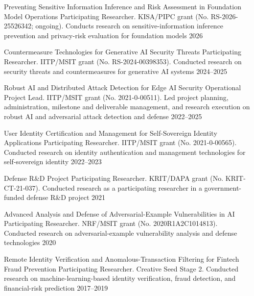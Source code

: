 
\begin{cvhonors}
  \cvhonor
    {Preventing Sensitive Information Inference and Risk Assessment in Foundation Model Operations}
    {Participating Researcher. KISA/PIPC grant (No. RS-2026-25526342; ongoing). Conducts research on sensitive-information inference prevention and privacy-risk evaluation for foundation models}
    {}
    {2026}

  \cvhonor
    {Countermeasure Technologies for Generative AI Security Threats}
    {Participating Researcher. IITP/MSIT grant (No. RS-2024-00398353). Conducted research on security threats and countermeasures for generative AI systems}
    {}
    {2024--2025}

  \cvhonor
    {Robust AI and Distributed Attack Detection for Edge AI Security}
    {Operational Project Lead. IITP/MSIT grant (No. 2021-0-00511). Led project planning, administration, milestone and deliverable management, and research execution on robust AI and adversarial attack detection and defense}
    {}
    {2022--2025}

  \cvhonor
    {User Identity Certification and Management for Self-Sovereign Identity Applications}
    {Participating Researcher. IITP/MSIT grant (No. 2021-0-00565). Conducted research on identity authentication and management technologies for self-sovereign identity}
    {}
    {2022--2023}

  \cvhonor
    {Defense R\&D Project}
    {Participating Researcher. KRIT/DAPA grant (No. KRIT-CT-21-037). Conducted research as a participating researcher in a government-funded defense R\&D project}
    {}
    {2021}

  \cvhonor
    {Advanced Analysis and Defense of Adversarial-Example Vulnerabilities in AI}
    {Participating Researcher. NRF/MSIT grant (No. 2020R1A2C1014813). Conducted research on adversarial-example vulnerability analysis and defense technologies}
    {}
    {2020}

  \cvhonor
    {Remote Identity Verification and Anomalous-Transaction Filtering for Fintech Fraud Prevention}
    {Participating Researcher. Creative Seed Stage 2. Conducted research on machine-learning-based identity verification, fraud detection, and financial-risk prediction}
    {}
    {2017--2019}
\end{cvhonors}

